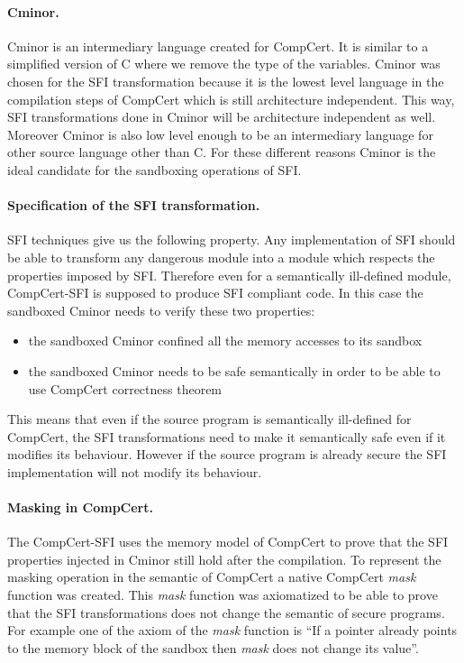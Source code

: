 \documentclass[11pt]{sdm}
\begin{document}
\paragraph{Cminor.}
\label{par:Cminor}

Cminor is an intermediary language created for CompCert. It is similar to a simplified version of C where we remove the type of the variables. Cminor was chosen for the SFI transformation because it is the lowest level language in the compilation steps of CompCert which is still architecture independent. This way, SFI transformations done in Cminor will be architecture independent as well. Moreover Cminor is also low level enough to be an intermediary language for other source language other than C. For these different reasons Cminor is the ideal candidate for the sandboxing operations of SFI.

\paragraph{Specification of the SFI transformation.}
\label{par:Specification of the SFI tranformation}
SFI techniques give us the following property. Any implementation of SFI should be able to transform any dangerous module into a module which respects the properties imposed by SFI. Therefore even for a semantically ill-defined module, CompCert-SFI is supposed to produce SFI compliant code.
In this case the sandboxed Cminor needs to verify these two properties:
\begin{itemize}
	\item the sandboxed Cminor confined all the memory accesses to its sandbox
	\item the sandboxed Cminor needs to be safe semantically in order to be able to use CompCert correctness theorem
\end{itemize}

This means that even if the source program is semantically ill-defined for CompCert, the SFI transformations need to make it semantically safe even if it modifies its behaviour.
However if the source program is already secure the SFI implementation will not modify its behaviour.

\paragraph{Masking in CompCert.}
\label{par:Masking in CompCert}
The CompCert-SFI uses the memory model of CompCert to prove that the SFI properties injected in Cminor still hold after the compilation. To represent the masking operation in the semantic of CompCert a native CompCert \textit{mask} function was created. This \textit{mask} function was axiomatized to be able to prove that the SFI transformations does not change the semantic of secure programs.
For example one of the axiom of the \textit{mask} function is ``If a pointer already points to the memory block of the sandbox then \textit{mask} does not change its value''.
\end{document}
